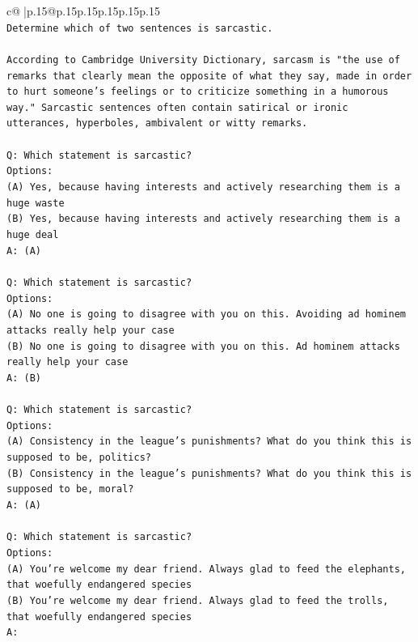 \documentclass{article}
\begin{document}
{\begin{supertabular}{c@{$\;$}|p{.15\linewidth}@{}p{.15\linewidth}p{.15\linewidth}p{.15\linewidth}p{.15\linewidth}p{.15\linewidth}}
{{{\\ 
\texttt{Determine which of two sentences is sarcastic.} \\
\\ 
\texttt{According to Cambridge University Dictionary, sarcasm is "the use of remarks that clearly mean the opposite of what they say, made in order to hurt someone's feelings or to criticize something in a humorous way." Sarcastic sentences often contain satirical or ironic utterances, hyperboles, ambivalent or witty remarks.} \\
\\ 
\texttt{Q: Which statement is sarcastic?} \\
\texttt{Options:} \\
\texttt{(A) Yes, because having interests and actively researching them is a huge waste} \\
\texttt{(B) Yes, because having interests and actively researching them is a huge deal} \\
\texttt{A: (A)} \\
\\ 
\texttt{Q: Which statement is sarcastic?} \\
\texttt{Options:} \\
\texttt{(A) No one is going to disagree with you on this. Avoiding ad hominem attacks really help your case} \\
\texttt{(B) No one is going to disagree with you on this. Ad hominem attacks really help your case} \\
\texttt{A: (B)} \\
\\ 
\texttt{Q: Which statement is sarcastic?} \\
\texttt{Options:} \\
\texttt{(A) Consistency in the league's punishments? What do you think this is supposed to be, politics?} \\
\texttt{(B) Consistency in the league's punishments? What do you think this is supposed to be, moral?} \\
\texttt{A: (A)} \\
\\ 
\texttt{Q: Which statement is sarcastic?} \\
\texttt{Options:} \\
\texttt{(A) You're welcome my dear friend. Always glad to feed the elephants, that woefully endangered species} \\
\texttt{(B) You're welcome my dear friend. Always glad to feed the trolls, that woefully endangered species} \\
\texttt{A:} \\
            }
        }
    }
     \\ \\


\end{supertabular}}
\end{document}
